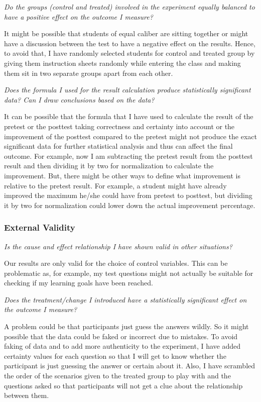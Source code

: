 \emph{Do the groups (control and treated) involved in the experiment equally balanced to have a positive effect on the outcome I measure?}

\medskip
\noindent It might be possible that students of equal caliber are sitting together or might have a discussion between the test to have a negative effect on the results. Hence, to avoid that, I have randomly selected students for control and treated group by giving them instruction sheets randomly while entering the class and making them sit in two separate groups apart from each other.

\emph{Does the formula I used for the result calculation produce statistically significant data? Can I draw conclusions based on the data?}

\medskip
\noindent It can be possible that the formula that I have used to calculate the result of the pretest or the posttest taking correctness and certainty into account or the improvement of the posttest compared to the pretest might not produce the exact significant data for further statistical analysis and thus can affect the final outcome. For example, now I am subtracting the pretest result from the posttest result and then dividing it by two for normalization to calculate the improvement. But, there might be other ways to define what improvement is relative to the pretest result. For example, a student might have already improved the maximum he/she could have from pretest to posttest, but dividing it by two for normalization could lower down the actual improvement percentage.

\subsubsection{External Validity}\label{subsubsec:externalvalidity}
\emph{Is the cause and effect relationship I have shown valid in other situations?}

\medskip
\noindent Our results are only valid for the choice of control variables.
This can be problematic as, for example, my test questions might not actually be suitable for checking if my learning goals have been reached.

\emph{Does the treatment/change I introduced have a statistically significant effect on the outcome I measure?}

\medskip
\noindent A problem could be that participants just guess the answers wildly. So it might possible that the data could be faked or incorrect due to mistakes. To avoid faking of data and to add more authenticity to the experiment, I have added certainty values for each question so that I will get to know whether the participant is just guessing the answer or certain about it. Also, I have scrambled the order of the scenarios given to the treated group to play with and the questions asked so that participants will not get a clue about the relationship between them.

